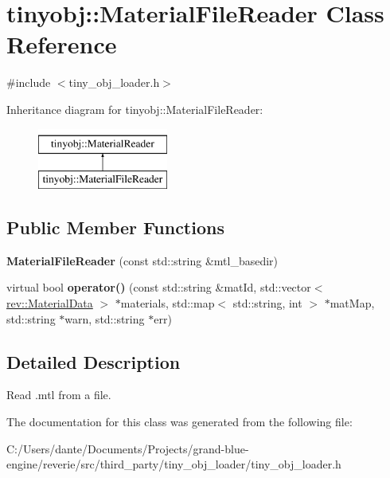 \hypertarget{classtinyobj_1_1_material_file_reader}{}\section{tinyobj\+::Material\+File\+Reader Class Reference}
\label{classtinyobj_1_1_material_file_reader}


{\ttfamily \#include $<$tiny\+\_\+obj\+\_\+loader.\+h$>$}

Inheritance diagram for tinyobj\+::Material\+File\+Reader\+:\begin{figure}[H]
\begin{center}
\leavevmode
\includegraphics[height=2.000000cm]{classtinyobj_1_1_material_file_reader}
\end{center}
\end{figure}
\subsection*{Public Member Functions}
\begin{DoxyCompactItemize}
\item 
\mbox{\label{classtinyobj_1_1_material_file_reader_aeb0c6d0e32d7876394e570a7b18adc8a}} 
{\bfseries Material\+File\+Reader} (const std\+::string \&mtl\+\_\+basedir)
\item 
\mbox{\label{classtinyobj_1_1_material_file_reader_a1bdc362bda5221ad284a4860cf7b0b02}} 
virtual bool {\bfseries operator()} (const std\+::string \&mat\+Id, std\+::vector$<$ \mbox{\hyperlink{structrev_1_1_material_data}{rev\+::\+Material\+Data}} $>$ $\ast$materials, std\+::map$<$ std\+::string, int $>$ $\ast$mat\+Map, std\+::string $\ast$warn, std\+::string $\ast$err)
\end{DoxyCompactItemize}


\subsection{Detailed Description}
Read .mtl from a file. 

The documentation for this class was generated from the following file\+:\begin{DoxyCompactItemize}
\item 
C\+:/\+Users/dante/\+Documents/\+Projects/grand-\/blue-\/engine/reverie/src/third\+\_\+party/tiny\+\_\+obj\+\_\+loader/tiny\+\_\+obj\+\_\+loader.\+h\end{DoxyCompactItemize}
